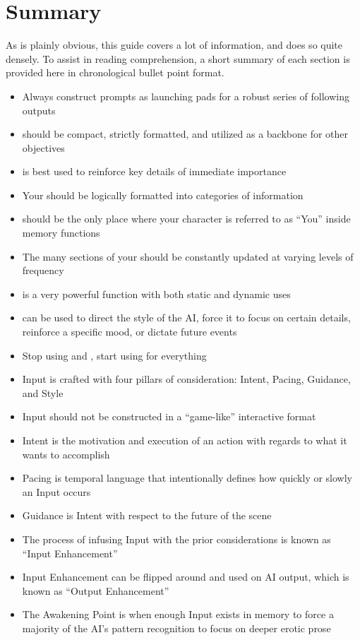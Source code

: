 \documentclass[Source-main.tex]{subfiles}
\begin{document}
\chapter{Summary}
\label{ch:summary}

As is plainly obvious, this guide covers a lot of information, and does so quite densely.
To assist in reading comprehension, a short summary of each section is provided here in chronological bullet point format.

\begin{itemize}

\item{Always construct prompts as launching pads for a robust series of following outputs}

\item{\wi should be compact, strictly formatted, and utilized as a backbone for other objectives}

\item{\rem is best used to reinforce key details of immediate importance}
\item{Your \rem should be logically formatted into categories of information}
\item{\rem should be the only place where your character is referred to as “You” inside memory functions}
\item{The many sections of your \rem should be constantly updated at varying levels of frequency}

\item{\an is a very powerful function with both static and dynamic uses} 
\item{\an can be used to direct the style of the AI, force it to focus on certain details, reinforce a specific mood, or dictate future events}

\item{Stop using \Do and \say, start using \story for everything}
\item{Input is crafted with four pillars of consideration: Intent, Pacing, Guidance, and Style}
\item{Input should not be constructed in a “game-like” interactive format}
\item{Intent is the motivation and execution of an action with regards to what it wants to accomplish}
\item{Pacing is temporal language that intentionally defines how quickly or slowly an Input occurs}
\item{Guidance is Intent with respect to the future of the scene}
\item{The process of infusing Input with the prior considerations is known as “Input Enhancement”}
\item{Input Enhancement can be flipped around and used on AI output, which is known as “Output Enhancement”}
\item{The Awakening Point is when enough Input exists in memory to force a majority of the AI's pattern recognition to focus on deeper erotic prose}


\end{itemize}
\end{document}
